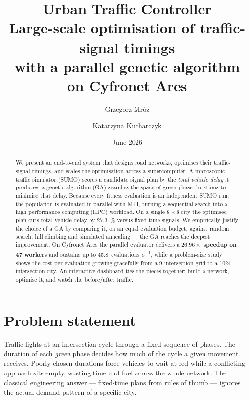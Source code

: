 \documentclass[11pt,a4paper]{article}
\title{\textbf{Urban Traffic Controller}\\[2pt]
\large Large-scale optimisation of traffic-signal timings\\
with a parallel genetic algorithm on Cyfronet Ares}
\author{Grzegorz Mróz \and Katarzyna Kucharczyk}
\date{June 2026}
\begin{document}
\maketitle

\tableofcontents
\bigskip

\begin{abstract}
\noindent
We present an end-to-end system that designs road networks, optimises their
traffic-signal timings, and scales the optimisation across a supercomputer.
A microscopic traffic simulator (SUMO) scores a candidate signal plan by the
\emph{total vehicle delay} it produces; a genetic algorithm (GA) searches the
space of green-phase durations to minimise that delay. Because every fitness
evaluation is an independent SUMO run, the population is evaluated in parallel
with MPI, turning a sequential search into a high-performance computing (HPC)
workload. On a single $8\times8$ city the optimised plan cuts total vehicle
delay by \SI{27.3}{\percent} versus fixed-time signals. We empirically justify
the choice of a GA by comparing it, on an equal evaluation budget, against
random search, hill climbing and simulated annealing --- the GA reaches the
deepest improvement. On Cyfronet Ares the parallel evaluator delivers a
\textbf{$26.96\times$ speedup on 47 workers} and sustains up to
\SI{45.8}{evaluations\per\second}, while a problem-size study shows the cost per
evaluation growing gracefully from a 9-intersection grid to a 1024-intersection
city. An interactive dashboard ties the pieces together: build a network,
optimise it, and watch the before/after traffic.
\end{abstract}
\bigskip

\section{Problem statement}
Traffic lights at an intersection cycle through a fixed sequence of phases.
The duration of each \emph{green} phase decides how much of the cycle a given
movement receives. Poorly chosen durations force vehicles to wait at red while
a conflicting approach sits empty, wasting time and fuel across the whole
network. The classical engineering answer --- fixed-time plans from rules of
thumb --- ignores the actual demand pattern of a specific city.
\end{document}
